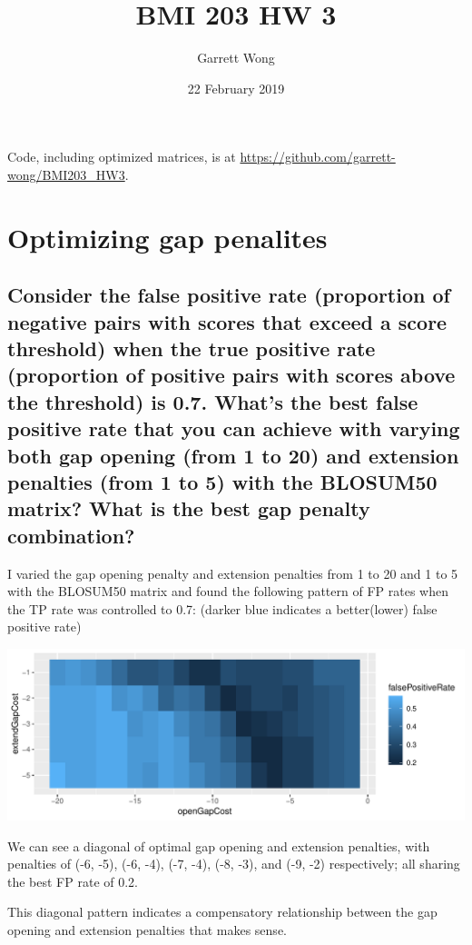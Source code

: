 \documentclass[]{article}
\begin{document}
\title{BMI 203 HW 3}
\author{Garrett Wong}
\date{22 February 2019}
\maketitle

Code, including optimized matrices, is at \url{https://github.com/garrett-wong/BMI203_HW3}.

\section{Optimizing gap penalites}

\subsection{Consider the false positive rate (proportion of negative pairs with scores that exceed a score threshold) when the true positive rate (proportion of positive pairs with scores above the threshold) is 0.7. What's the best false positive rate that you can achieve with varying both gap opening (from 1 to 20) and extension penalties (from 1 to 5) with the BLOSUM50 matrix? What is the best gap penalty combination?}

I varied the gap opening penalty and extension penalties from 1 to 20 and 1 to 5 with the BLOSUM50 matrix and found the following pattern of FP rates when the TP rate was controlled to 0.7: (darker blue indicates a better(lower) false positive rate)

\vspace{1em}
\includegraphics[width=\textwidth]{../BMI203_HW3_alignment/plots/optimizeGapPenalties.pdf}
\vspace{1em}

We can see a diagonal of optimal gap opening and extension penalties, with penalties of (-6, -5), (-6, -4), (-7, -4), (-8, -3), and (-9, -2) respectively; all sharing the best FP rate of 0.2.

This diagonal pattern indicates a compensatory relationship between the gap opening and extension penalties that makes sense.
\end{document}
